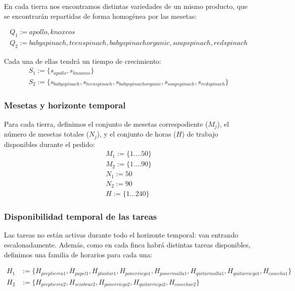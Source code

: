 En cada tierra nos encontramos distintas variedades de un mismo producto, que se encontrarán repartidas de forma homogénea por las mesetas:

\[\begin{aligned}
        Q_1:={apollo, knoxcos}\\
        Q_2:={babyspinach, teenspinach, babyspinachorganic, soupspinach, redspinach}
    \end{aligned}\]

Cada una de ellas tendrá un tiempo de crecimiento:
\[\begin{aligned}
        S_1:=\{s_{apollo},s_{knoxcos}\}\\
        S_2:=\{s_{babyspinach}, s_{teenspinach}, s_{babyspinachorganic}, s_{soupspinach}, s_{redspinach}\}
    \end{aligned}\]



\subsubsection{Mesetas y horizonte temporal}

Para cada tierra, definimos el conjunto de mesetas correspodiente ($M_j$), el número de mesetas totales ($N_j$), y el conjunto de horas ($H$) de trabajo disponibles durante el pedido:
    \[\begin{aligned}
        M_1:=\{1....50\}\\
        M_2:=\{1....90\}\\
        N_1:=50\\
        N_2:=90\\
        H:=\{1...240\}
    \end{aligned}\]

\subsubsection{Disponibilidad temporal de las tareas}

Las tareas no están activas durante todo el horizonte temporal: van entrando escalonadamente. 
Además, como en cada finca habrá distintas tareas disponibles, definimos una familia de horarios para cada una:

\[\begin{aligned}
    H_1 &:= \{H_{preptierra1},H_{papel1},H_{plantar1},H_{ponerriego1},H_{ponermalla1},H_{quitarmalla1},H_{quitarriego1},H_{cosecha1}\}\\
    H_2 &:= \{H_{preptierra2},H_{sembrar2},H_{ponerriego2},H_{quitarriego2},H_{cosechar2}\}   
\end{aligned}\]    

